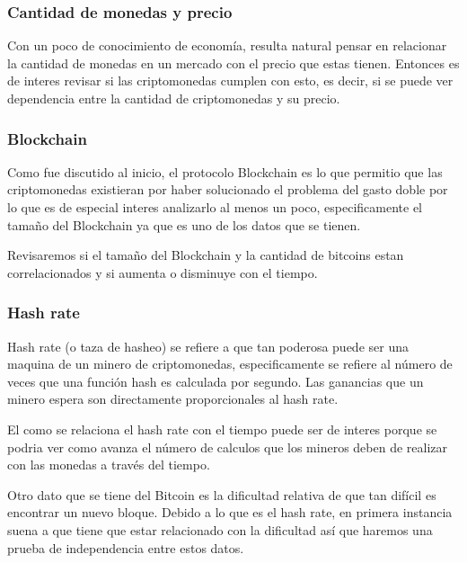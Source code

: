\documentclass[12pt,letterpaper]{article}
\begin{document}

    \subsubsection*{Cantidad de monedas y precio}

    Con un poco de conocimiento de economía, resulta natural pensar en relacionar la cantidad de monedas en un mercado con el precio que estas tienen. Entonces es de interes revisar si las criptomonedas cumplen con esto, es decir, si se puede ver dependencia entre la cantidad de criptomonedas y su precio.


    \subsubsection*{Blockchain}

    Como fue discutido al inicio, el protocolo Blockchain es lo que permitio que las criptomonedas existieran por haber solucionado el problema del gasto doble por lo que es de especial interes analizarlo al menos un poco, especificamente el tamaño del Blockchain ya que es uno de los datos que se tienen.

    Revisaremos si el tamaño del Blockchain y la cantidad de bitcoins estan correlacionados y si aumenta o disminuye con el tiempo.


    \subsubsection*{Hash rate}

    Hash rate (o taza de hasheo) se refiere a que tan poderosa puede ser una maquina de un minero de criptomonedas, especificamente se refiere al número de veces que una función hash es calculada por segundo. Las ganancias que un minero espera son directamente proporcionales al hash rate.

    El como se relaciona el hash rate con el tiempo puede ser de interes porque se podria ver como avanza el número de calculos que los mineros deben de realizar con las monedas a través del tiempo.



   Otro dato que se tiene del Bitcoin es la dificultad relativa de que tan difícil es encontrar un nuevo bloque. Debido a lo que es el hash rate, en primera instancia suena a que tiene que estar relacionado con la dificultad así que haremos una prueba de independencia entre estos datos. 
\end{document}
